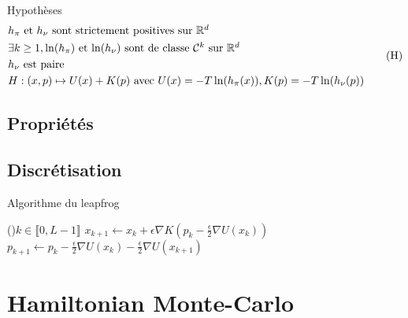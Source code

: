 \documentclass[10pt,a4paper]{article}
\begin{document}

\begin{frame}{Hypothèses}
	\begin{equation}\label{eq:hyp}
		\begin{aligned}
			&\mbox{$h_\pi$ et $h_\nu$ sont strictement positives sur $\mathbb{R}^d$} \\
			&\mbox{$\exists k \geq 1, \ln(h_\pi)$ et $\ln(h_\nu)$ sont de classe $\mathcal{C}^k$ sur $\mathbb{R}^d$}\\
			&\mbox{$h_\nu$ est paire} \\
	                & H : (x,p) \mapsto U(x) + K(p) \text{ avec } U(x) = - T \ln(h_\pi(x)), K(p) = -T \ln(h_\nu(p))
		\end{aligned}
		\tag{H}
	\end{equation}
\end{frame}

\subsection{Propriétés}


\subsection{Discrétisation}


\begin{frame}{Algorithme du leapfrog}
	\begin{center}
		\begin{algorithm}[H]
			\For(){$k \in \llbracket 0, L-1 \rrbracket$}{
				$x_{k+1} \leftarrow x_k + \epsilon \nabla K \left( p_k - \frac{\epsilon}{2} \nabla U(x_k) \right)$\;
				$p_{k+1} \leftarrow p_k - \frac{\epsilon}{2} \nabla U(x_k) - \frac{\epsilon}{2} \nabla U(x_{k+1})$\;
			}
			\caption{Discrétisation de l'évolution par saute-mouton (\emph{leapfrog})}
			\label{algo:leapfrog}
		\end{algorithm}
	\end{center}
\end{frame}

\section{Hamiltonian Monte-Carlo}
\end{document}

